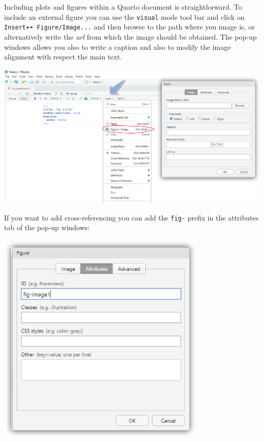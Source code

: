 \documentclass[
  letterpaper,
  DIV=11,
  numbers=noendperiod]{scrartcl}
\begin{document}
Including plots and figures within a Quarto document is straightforward.
To include an external figure you can use the \texttt{visual} mode tool
bar and click on \texttt{Insert▾➠\ Figure/Image...} and then browse to
the path where you image is, or alternatively write the \emph{url} from
which the image should be obtained. The pop-up windows allows you also
to write a caption and also to modify the image alignment with respect
the main text.

\begin{center}
\includegraphics{images/quarto8.png}
\end{center}

If you want to add cross-referencing you can add the \texttt{fig-}
prefix in the attributes tab of the pop-up windows:

\begin{center}
\includegraphics[width=3.94792in,height=\textheight]{images/quarto9.png}
\end{center}
\end{document}
